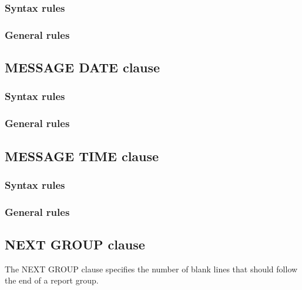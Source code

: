 \subsubsection{Syntax rules}

\subsubsection{General rules}

\subsection{MESSAGE DATE clause}

\begin{syntax}[\deletedcolour]
\end{syntax}

\subsubsection{Syntax rules}

\subsubsection{General rules}

\subsection{MESSAGE TIME clause}

\begin{syntax}[\deletedcolour]
\end{syntax}

\subsubsection{Syntax rules}

\subsubsection{General rules}

\subsection{NEXT GROUP clause}

The NEXT GROUP clause specifies the number of blank lines that should follow the end of a report group.

